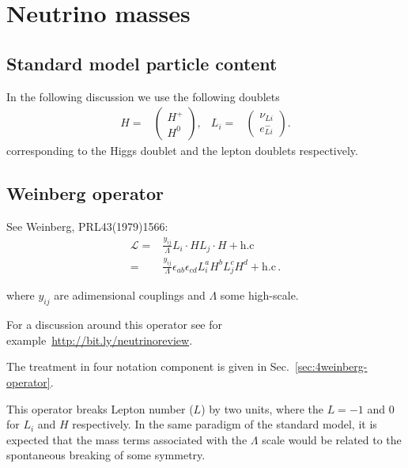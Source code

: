 
\chapter{Neutrino masses}

\section{Standard model particle content}

\begin{frame}
In the following discussion we use the following doublets
\begin{align}
  H=&
  \begin{pmatrix}
    H^+\\
    H^0
  \end{pmatrix},&
  L_i=&
  \begin{pmatrix}
    \nu_{Li}\\
    e_{Li}^{-}
  \end{pmatrix}.
\end{align}
corresponding to the Higgs doublet and the lepton doublets respectively.
\end{frame}

\section{Weinberg operator}

\begin{frame}
See Weinberg,  PRL43(1979)1566:
 \begin{align*}
   \mathcal{L}
   =&\frac{y_{ij}}{\Lambda} L_i\cdot H L_j\cdot H+\text{h.c}\nonumber\\
   =&\frac{y_{ij}}{\Lambda}\epsilon_{ab}\epsilon_{cd} L^a_i H^b L^c_j H^d+\text{h.c}\,.
 \end{align*}

where $y_{ij}$ are adimensional couplings and $\Lambda$ some high-scale.

For a discussion around this operator see for example~\url{http://bit.ly/neutrinoreview}.
\end{frame}

The treatment in four notation component is given in Sec.~\ref{sec:4weinberg-operator}.


This operator breaks Lepton number ($L$) by two units, where the $L=-1$ and $0$ for $L_i$ and $H$ respectively.
In the same paradigm of the standard model, it is expected that the mass terms associated with the $\Lambda$ scale would be related to the spontaneous breaking of some symmetry. 



